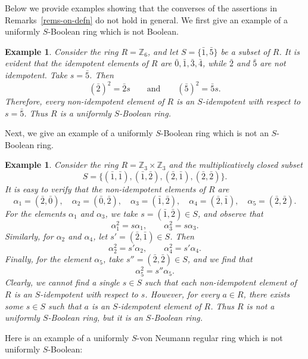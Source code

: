 \documentclass[12pt]{article}
\newtheorem{exmp}[thm]{\bf Example}
\begin{document}
Below we provide examples showing that the converses of the assertions in Remarks~\ref{rems-on-defn} do not hold in general.  
We first give an example of a uniformly \( S \)-Boolean ring which is not Boolean.

\begin{exmp}\label{uni-bool}
Consider the ring \( R = \mathbb{Z}_6 \), and let \( S = \{ \bar{1}, \bar{5}\} \) be a subset of \( R \).  
It is evident that the idempotent elements of \( R \) are \( \bar{0}, \bar{1}, \bar{3}, \bar{4} \), while \( \bar{2} \) and \( \bar{5} \) are not idempotent.  
Take \( s=\bar{5} \). Then 
\[
(\bar{2})^2 = \bar{2}s \qquad \text{and} \qquad (\bar{5})^2 = \bar{5}s.
\]
Therefore, every non-idempotent element of \( R \) is an \( S \)-idempotent with respect to \( s=\bar{5} \).  
Thus \( R \) is a uniformly \( S \)-Boolean ring.
\end{exmp}
 
Next, we give an example of a uniformly \( S \)-Boolean ring which is not an \( S \)-Boolean ring.

\begin{exmp}\label{exmp-S-vN-reg-not-u-S-vN-reg}
Consider the ring \( R = \mathbb{Z}_3 \times \mathbb{Z}_3 \) and the multiplicatively closed subset 
\[
S = \{ (\bar{1}, \bar{1}), (\bar{1}, \bar{2}), (\bar{2}, \bar{1}), (\bar{2}, \bar{2}) \}.
\]
It is easy to verify that the non-idempotent elements of \( R \) are 
\[
\alpha_1 = (\bar{2}, \bar{0}), \quad 
\alpha_2 = (\bar{0}, \bar{2}), \quad 
\alpha_3 = (\bar{1}, \bar{2}), \quad 
\alpha_4 = (\bar{2}, \bar{1}), \quad 
\alpha_5 = (\bar{2}, \bar{2}).
\]
For the elements \( \alpha_1 \) and \( \alpha_3 \), we take \( s = (\bar{1}, \bar{2}) \in S \), and observe that 
\[
\alpha_1^2 = s \alpha_1, \qquad \alpha_3^2 = s \alpha_3.
\]
Similarly, for \( \alpha_2 \) and \( \alpha_4 \), let \( s' = (\bar{2}, \bar{1}) \in S \). Then 
\[
\alpha_2^2 = s' \alpha_2, \qquad \alpha_4^2 = s' \alpha_4.
\]
Finally, for the element \( \alpha_5 \), take \( s'' = (\bar{2}, \bar{2}) \in S \), and we find that 
\[
\alpha_5^2 = s'' \alpha_5.
\]
Clearly, we cannot find a single \( s\in S \) such that each non-idempotent element of \( R \) is an \( S \)-idempotent with respect to \( s \).  
However, for every \( a \in R \), there exists some \( s \in S \) such that \( a \) is an \( S \)-idempotent element of \( R \).  
Thus \( R \) is not a uniformly \( S \)-Boolean ring, but it is an \( S \)-Boolean ring.
\end{exmp}

Here is an example of a uniformly \( S \)-von Neumann regular ring which is not uniformly \( S \)-Boolean:
\end{document}
